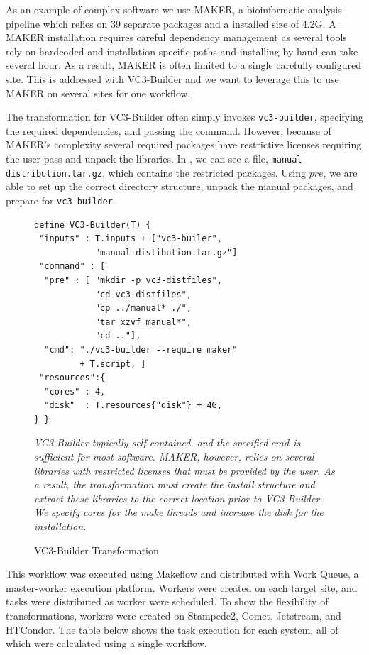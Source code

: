\documentclass[conference]{IEEEtran}
\begin{document}
As an example of complex software we use MAKER\cite{pmid18025269},
a bioinformatic analysis pipeline which relies
on 39 separate packages and a installed size of 4.2G.
A MAKER installation requires careful
dependency management as several tools rely
on hardcoded and installation specific paths
and installing by hand can take several hour.
As a result, MAKER is often limited to a single
carefully configured site.
This is addressed with VC3-Builder and
we want to leverage this to use MAKER 
on several sites for one workflow.

The transformation for VC3-Builder often
simply invokes {\tt vc3-builder},
specifying the required dependencies,
and passing the command.
However, because of MAKER's complexity several
required packages have restrictive licenses
requiring the user 
pass and unpack the libraries.
In , we can see a file,
{\tt manual-distribution.tar.gz}, which
contains the restricted packages.
Using $pre$, we are able to set up the
correct directory structure,
unpack the manual packages,
and prepare for {\tt vc3-builder}.


\begin{figure}
\begin{framed}
\begin{verbatim}
define VC3-Builder(T) {
 "inputs" : T.inputs + ["vc3-builer",
            "manual-distibution.tar.gz"]
 "command" : [
  "pre" : [ "mkdir -p vc3-distfiles",
            "cd vc3-distfiles",
            "cp ../manual* ./",
            "tar xzvf manual*",
            "cd .."],
  "cmd": "./vc3-builder --require maker"
         + T.script, ]
 "resources":{
  "cores" : 4,
  "disk"  : T.resources{"disk"} + 4G,
} }
\end{verbatim}
\end{framed}
\caption{VC3-Builder Transformation}
\small
\emph{VC3-Builder typically  
self-contained, and the specified
$cmd$ is sufficient for most software.
MAKER, however, relies on several libraries
with restricted licenses that must be
provided by the user. 
As a result, the transformation must
create the install structure and 
extract these libraries to the correct
location prior to VC3-Builder.
We specify cores for the make threads and 
increase the disk for the installation.
}
\label{vc3-builder}
\end{figure}

This workflow was executed using Makeflow
and distributed with Work Queue\cite{wq-python-pyhpc2011},
a master-worker execution platform. 
Workers were created on each target site,
and tasks were distributed as worker were 
scheduled.
To show the flexibility of transformations,
workers were created on Stampede2, Comet,
Jetstream, and HTCondor.
The table below shows the task execution
for each system, 
all of which were calculated using a single workflow.
\end{document}

